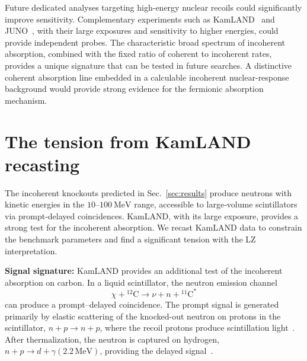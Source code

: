 \documentclass[aps,twocolumn,superscriptaddress,groupedaddress,nofootinbib,floatfix]{revtex4}
\newcommand{\MeV}{\,\mathrm{MeV}}
\begin{document}
Future dedicated analyses targeting high-energy nuclear recoils could significantly improve sensitivity. Complementary experiments such as KamLAND~\cite{KamLAND:2011bnd} and JUNO~\cite{JUNO:2022lpc}, with their large exposures and sensitivity to higher energies, could provide independent probes. The characteristic broad spectrum of incoherent absorption, combined with the fixed ratio of coherent to incoherent rates, provides a unique signature that can be tested in future searches. A distinctive coherent absorption line embedded in a calculable incoherent nuclear-response background would provide strong evidence for the fermionic absorption mechanism.


\section{The tension from KamLAND recasting}
\label{sec:KamLAND}

The incoherent knockouts predicted in Sec.~\ref{sec:results} produce neutrons with kinetic energies in the $10$--$100\ \text{MeV}$ range, accessible to large‑volume scintillators via prompt‑delayed coincidences. KamLAND, with its large exposure, provides a strong test for the incoherent absorption. We recast KamLAND data to constrain the benchmark parameters and find a significant tension with the LZ interpretation.

\textbf{Signal signature:} KamLAND provides an additional test of the incoherent absorption on carbon.  In a liquid scintillator, the neutron emission channel
\begin{equation}
\chi+{}^{12}\mathrm{C}
\rightarrow
\nu+n+{}^{11}\mathrm{C}^{\ast}
\label{eq:kamland-process}
\end{equation}
can produce a prompt--delayed coincidence.  The prompt signal is
generated primarily by elastic scattering of the knocked-out neutron on
protons in the scintillator, $n+p\rightarrow n+p$,
where the recoil protons produce scintillation light~\cite{Gong:2025ves}. After
thermalization, the neutron is captured on hydrogen, $n+p\rightarrow d+\gamma(2.2\MeV)$, providing the delayed signal~\cite{Gong:2025ves,KamLAND:2021gvi}.
\end{document}
